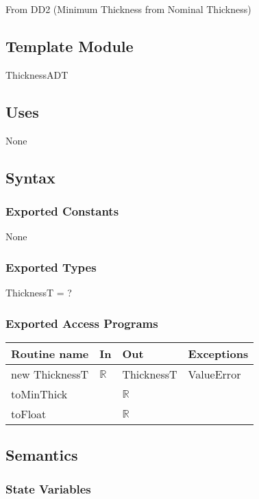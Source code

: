 \documentclass[12pt, titlepage]{article}
\begin{document}
From DD2 (Minimum Thickness from Nominal Thickness) %

\subsection{Template Module}

ThicknessADT

\subsection {Uses}

None

\subsection {Syntax}

\subsubsection {Exported Constants}

None

\subsubsection {Exported Types}

ThicknessT = ?

\subsubsection {Exported Access Programs}

\begin{tabular}{| l | l | l | p{5cm} |}
\hline
\textbf{Routine name} & \textbf{In} & \textbf{Out} & \textbf{Exceptions}\\
\hline
new ThicknessT & $\mathbb{R}$ & ThicknessT & ValueError\\
\hline
toMinThick & ~ & $\mathbb{R}$ & ~\\
\hline
toFloat & ~ & $\mathbb{R}$ & ~\\
\hline
\end{tabular}

\subsection {Semantics}

\subsubsection {State Variables}
\end{document}
